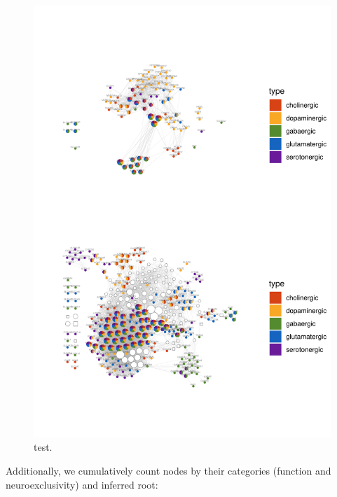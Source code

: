 \begin{figure}
\centering
\includegraphics[width=\textwidth,height=0.9\textheight]{figs/analysis.network.fig3_raw-1}
\caption{test.}
\end{figure}

\clearpage

Additionally, we cumulatively count nodes by their categories (function
and neuroexclusivity) and inferred root:

